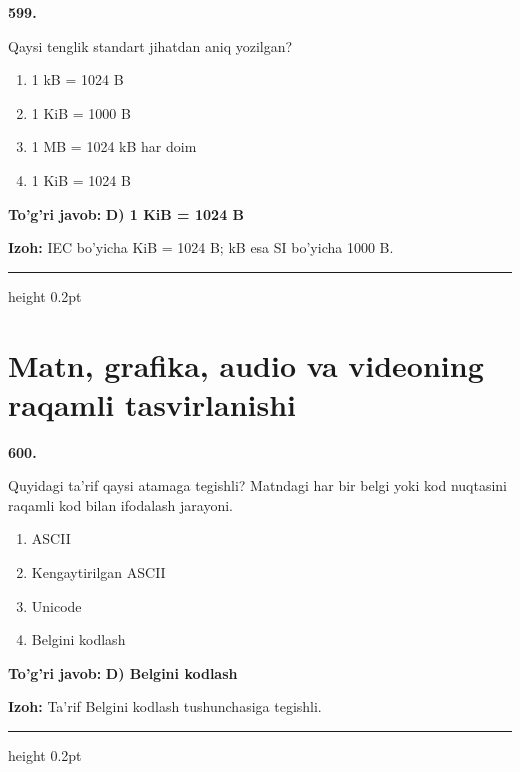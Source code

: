 \documentclass[10pt,a4paper,oneside]{article}
\begin{document}
\noindent\textbf{\color{ink}599.}
\par
Qaysi tenglik standart jihatdan aniq yozilgan?
\begin{enumerate}[label=\Alph*),leftmargin=9mm]
\item 1 kB = 1024 B
\item 1 KiB = 1000 B
\item 1 MB = 1024 kB har doim
\item 1 KiB = 1024 B
\end{enumerate}
\begin{tcolorbox}[enhanced,breakable,colback=teal!4,colframe=teal!50!black,boxrule=0.5pt,arc=1.1mm,left=3mm,right=3mm,top=1.7mm,bottom=1.7mm,before skip=2mm,after skip=2mm]
\textbf{\color{teal}To'g'ri javob:} \textbf{D) 1 KiB = 1024 B}
\par\smallskip
\textbf{Izoh:} IEC bo'yicha KiB = 1024 B; kB esa SI bo'yicha 1000 B.
\end{tcolorbox}
\vspace{2mm}\hrule height 0.2pt \vspace{3mm}
\section{Matn, grafika, audio va videoning raqamli tasvirlanishi}

\noindent\textbf{\color{ink}600.}
\par
Quyidagi ta'rif qaysi atamaga tegishli? Matndagi har bir belgi yoki kod nuqtasini raqamli kod bilan ifodalash jarayoni.
\begin{enumerate}[label=\Alph*),leftmargin=9mm]
\item ASCII
\item Kengaytirilgan ASCII
\item Unicode
\item Belgini kodlash
\end{enumerate}
\begin{tcolorbox}[enhanced,breakable,colback=teal!4,colframe=teal!50!black,boxrule=0.5pt,arc=1.1mm,left=3mm,right=3mm,top=1.7mm,bottom=1.7mm,before skip=2mm,after skip=2mm]
\textbf{\color{teal}To'g'ri javob:} \textbf{D) Belgini kodlash}
\par\smallskip
\textbf{Izoh:} Ta'rif Belgini kodlash tushunchasiga tegishli.
\end{tcolorbox}
\vspace{2mm}\hrule height 0.2pt \vspace{3mm}
\end{document}
